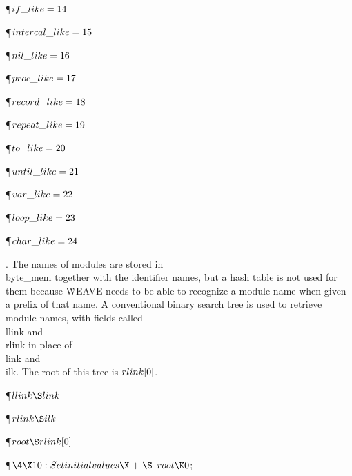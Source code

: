 \P\D {}$\\{if\_like}=14$\par
\P\D {}$\\{intercal\_like}=15$\par
\P\D {}$\\{nil\_like}=16$\par
\P\D {}$\\{proc\_like}=17$\par
\P\D {}$\\{record\_like}=18$\par
\P\D {}$\\{repeat\_like}=19$\par
\P\D {}$\\{to\_like}=20$\par
\P\D {}$\\{until\_like}=21$\par
\P\D {}$\\{var\_like}=22$\par
\P\D {}$\\{loop\_like}=23$\par
\P\D {}$\\{char\_like}=24$\par
\fi

. The names of modules are stored in \\{byte\_mem} together
with the identifier names, but a hash table is not used for them because
\.{WEAVE} needs to be able to recognize a module name when given a prefix of
that name. A conventional binary search tree is used to retrieve module names,
with fields called \\{llink} and \\{rlink} in place of \\{link} and \\{ilk}.
The
root of this tree is $\\{rlink}[0]$.

\Y\P\D {}$\\{llink}\S\\{link}$\par
\P\D {}$\\{rlink}\S\\{ilk}$\par
\P\D {}$\\{root}\S\\{rlink}[0]$\par
\Y\P$\4\X10:Set initial values\X\mathrel{+}\S$\6
$\\{root}\K0$;\par
\fi

